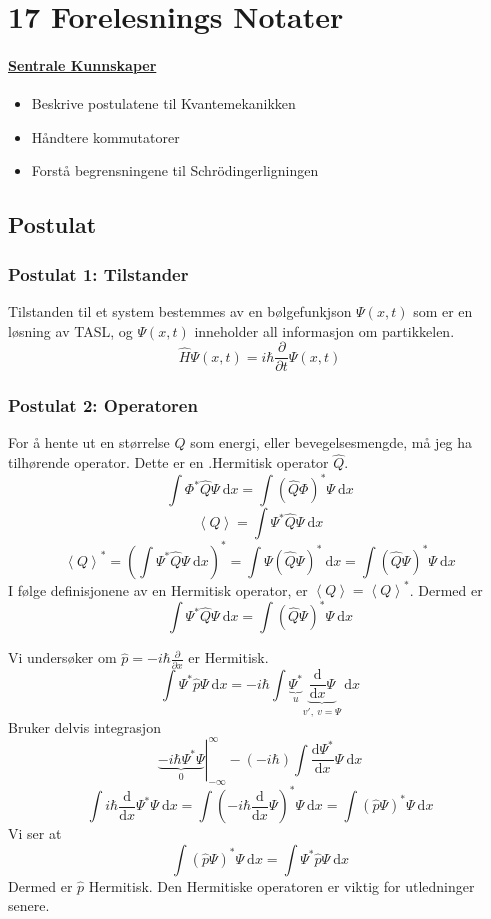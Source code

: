 \section{17 Forelesnings Notater}
\paragraph*{\underline{Sentrale Kunnskaper}}
\begin{itemize}
    \item Beskrive postulatene til Kvantemekanikken
    \item Håndtere kommutatorer
    \item Forstå begrensningene til Schrödingerligningen
\end{itemize}

\subsection{Postulat}
  
\subsubsection*{Postulat 1: Tilstander}
Tilstanden til et system bestemmes av en bølgefunkjson $Ψ(x,t)$ som er en løsning av TASL, og $Ψ(x,t)$ inneholder all informasjon om partikkelen. 
\[
\hat{H}\Psi(x,t) = iℏ \frac{∂ }{∂ t} Ψ(x,t)
\]
\subsubsection*{Postulat 2: Operatoren}
For å hente ut en størrelse $Q$ som energi, eller bevegelsesmengde, må jeg ha tilhørende operator. Dette er en .Hermitisk operator $\hat{Q}$.
\[
∫ Φ^{*} \hat{Q}Ψ \ \mathrm{d}x = ∫ \left(\hat{Q}Φ\right)^{*}Ψ \ \mathrm{d}x
\]
\[
\left<Q\right> = ∫ Ψ^{*} \hat{Q}Ψ \ \mathrm{d}x
\]
\[
\left<Q\right>^{*} = \left(∫ Ψ^{*}\hat{Q}Ψ \ \mathrm{d}x\right)^{*} = ∫ Ψ \left(\hat{Q}Ψ\right)^{*} \ \mathrm{d}x = ∫ \left(\hat{Q}Ψ\right)^{*} Ψ \ \mathrm{d}x
\]
I følge definisjonene av en Hermitisk operator, er $\left<Q\right> = \left<Q\right>^{*}$. Dermed er 
\[
∫ Ψ^{*}\hat{Q}Ψ \ \mathrm{d}x = ∫ \left(\hat{Q}Ψ\right)^{*} Ψ \ \mathrm{d}x
\]

Vi undersøker om $\hat{p} = -iℏ \frac{∂}{∂x}$ er Hermitisk. 
\[
∫ Ψ^{*}\hat{p}Ψ \ \mathrm{d}x = -iℏ ∫  \underbrace{Ψ^{*}}_{u} \underbrace{\frac{\mathrm{d}}{\mathrm{d}x}Ψ}_{v', \ v = Ψ} \ \mathrm{d}x
\]
Bruker delvis integrasjon
\[
\left.\underbrace{-iℏ Ψ^{*}Ψ}_{0}\right\rvert_{-∞}^{∞} - \left(-iℏ\right) ∫ \frac{\mathrm{d}Ψ^{*}}{\mathrm{d}x} Ψ \ \mathrm{d}x
\]
\[
∫ iℏ \frac{\mathrm{d}}{\mathrm{d}x} Ψ^{*} Ψ \ \mathrm{d}x = ∫ \left(-iℏ\frac{\mathrm{d}}{\mathrm{d}x}Ψ\right)^{*} Ψ \ \mathrm{d}x = ∫ \left(\hat{p}Ψ\right)^{*} Ψ \ \mathrm{d}x
\]
Vi ser at 
\[
∫ \left(\hat{p}Ψ\right)^{*} Ψ \ \mathrm{d}x = ∫ Ψ^{*}\hat{p}Ψ \ \mathrm{d}x
\]
Dermed er $\hat{p}$ Hermitisk.
Den Hermitiske operatoren er viktig for utledninger senere. 


